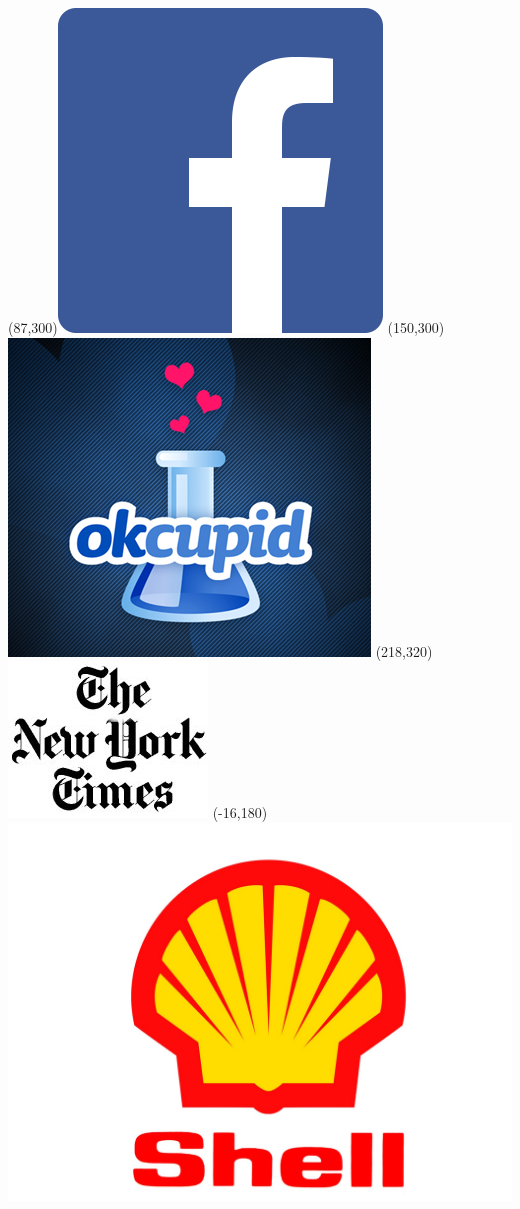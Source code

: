 \begin{frame}
\Put(87,300){\includegraphics[scale=.2]{../common/pics/logos/fb}}
\Put(150,300){\includegraphics[scale=.2]{../common/pics/logos/okcupid}}
\Put(218,320){\includegraphics[scale=.35]{../common/pics/logos/nyt}}
\Put(-16,180){\includegraphics[scale=.05]{../common/pics/logos/shell}}

\end{frame}
